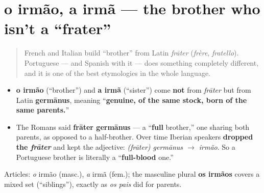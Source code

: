 \section[o irmão, a irmã]{o irmão, a irmã — the brother who isn't a \textquotedblleft{}frater\textquotedblright{}}

\label{lesson:PT-C10-irmaos}



\begin{quote}
French and Italian build \textquotedblleft{}brother\textquotedblright{} from Latin \emph{frāter} (\emph{frère}, \emph{fratello}). Portuguese — and Spanish with it — does something completely different, and it is one of the best etymologies in the whole language.
\end{quote}

\begin{cousinweb}
\begin{itemize}
\raggedright
  \item \textbf{o irmão} (\textquotedblleft{}brother\textquotedblright{}) and \textbf{a irmã} (\textquotedblleft{}sister\textquotedblright{}) come \textbf{not} from \emph{frāter} but from Latin \textbf{germānus}, meaning \textquotedblleft{}\textbf{genuine, of the same stock, born of the same parents.}\textquotedblright{}
  \item The Romans said \textbf{frāter germānus} — a \textquotedblleft{}\textbf{full} brother,\textquotedblright{} one sharing both parents, as opposed to a half-brother. Over time Iberian speakers \textbf{dropped the \emph{frāter}} and kept the adjective: \emph{(frāter) germānus $\to$ irmão}. So a Portuguese brother is literally a \textquotedblleft{}\textbf{full-blood} one.\textquotedblright{}
\end{itemize}

Articles: \emph{o} irmão (masc.), \emph{a} irmã (fem.); the masculine plural \textbf{os irmãos} covers a mixed set (\textquotedblleft{}siblings\textquotedblright{}), exactly as \emph{os pais} did for parents.
\end{cousinweb}

